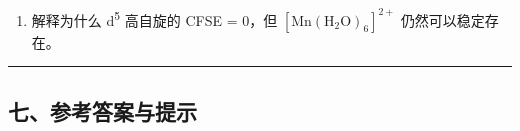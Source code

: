 \documentclass[a4paper,11pt]{ctexart}
\providecommand{\tightlist}{\setlength{\itemsep}{0pt}\setlength{\parskip}{0pt}}
\newcommand{\箭}{\ensuremath{\rightarrow}}
\newcommand{\左箭}{\ensuremath{\leftarrow}}
\newcommand{\上箭}{\ensuremath{\uparrow}}
\newcommand{\下箭}{\ensuremath{\downarrow}}
\newcommand{\衡}{\ensuremath{\rightleftharpoons}}
\newcommand{\双箭}{\ensuremath{\leftrightarrow}}
\newcommand{\约等于}{\ensuremath{\approx}}
\newcommand{\小于等于}{\ensuremath{\leq}}
\newcommand{\大于等于}{\ensuremath{\geq}}
\newcommand{\不等于}{\ensuremath{\neq}}
\newcommand{\西格马}{\ensuremath{\sigma}}
\newcommand{\派}{\ensuremath{\pi}}
\begin{document}
\begin{enumerate}
  \begin{enumerate}
  \def\labelenumii{(\alph{enumii})}
  \tightlist
  \item
    分别写出 Fe\textsuperscript{3+} 的 d 电子排布。
  \item
    解释磁矩差异的电子结构原因。
  \item
    从光谱化学序列角度解释为什么 F\textsuperscript{-} 是弱场配体而 CN\textsuperscript{-} 是强场配体。
  \end{enumerate}
\item
  解释为什么 d\textsuperscript{5} 高自旋的 CFSE = 0，但 \([\mathrm{Mn(H_2O)_6}]^{2+}\) 仍然可以稳定存在。
\end{enumerate}

\begin{center}\rule{0.5\linewidth}{0.5pt}\end{center}

\subsection{七、参考答案与提示}\label{ux4e03ux53c2ux8003ux7b54ux6848ux4e0eux63d0ux793a}
\end{document}
